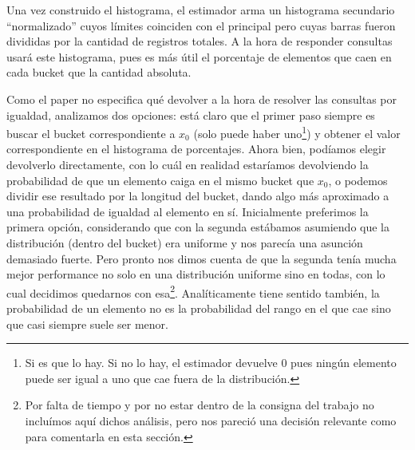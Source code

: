 Una vez construido el histograma, el estimador arma un histograma secundario ``normalizado'' cuyos límites coinciden con el principal pero cuyas barras fueron divididas por la cantidad de registros totales. A la hora de responder consultas usará este histograma, pues es más útil el porcentaje de elementos que caen en cada bucket que la cantidad absoluta.

Como el paper no especifica qué devolver a la hora de resolver las consultas por igualdad, analizamos dos opciones: está claro que el primer paso siempre es buscar el bucket correspondiente a $x_0$ (solo puede haber uno\footnote{Si es que lo hay. Si no lo hay, el estimador devuelve 0 pues ningún elemento puede ser igual a uno que cae fuera de la distribución.}) y obtener el valor correspondiente en el histograma de porcentajes. Ahora bien, podíamos elegir devolverlo directamente, con lo cuál en realidad estaríamos devolviendo la probabilidad de que un elemento caiga en el mismo bucket que $x_0$, o podemos dividir ese resultado por la longitud del bucket, dando algo más aproximado a una probabilidad de igualdad al elemento en sí. Inicialmente preferimos la primera opción, considerando que con la segunda estábamos asumiendo que la distribución (dentro del bucket) era uniforme y nos parecía una asunción demasiado fuerte. Pero pronto nos dimos cuenta de que la segunda tenía mucha mejor performance no solo en una distribución uniforme sino en todas, con lo cual decidimos quedarnos con esa\footnote{Por falta de tiempo y por no estar dentro de la consigna del trabajo no incluímos aquí dichos análisis, pero nos pareció una decisión relevante como para comentarla en esta sección.}. Analíticamente tiene sentido también, la probabilidad de un elemento no es la probabilidad del rango en el que cae sino que casi siempre suele ser menor.

